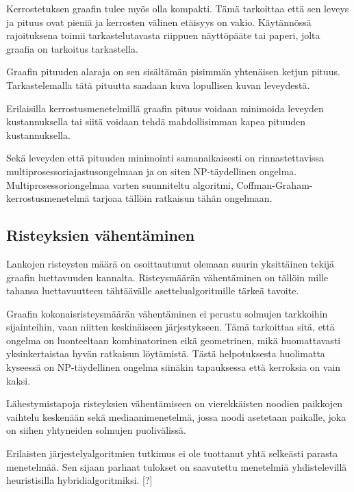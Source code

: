 \documentclass[finnish,12pt]{article}
\begin{document}
Kerrostetuksen graafin tulee myös olla kompakti. Tämä tarkoittaa että sen leveys ja pituus ovat pieniä ja kerrosten välinen etäisyys on vakio. 
Käytännössä rajoituksena toimii tarkastelutavasta riippuen näyttöpääte tai paperi, jolta graafia on tarkoitus tarkastella.

Graafin pituuden alaraja on sen sisältämän pisimmän yhtenäisen ketjun pituus. Tarkastelemalla tätä pituutta saadaan kuva lopullisen kuvan leveydestä.

Erilaisilla kerrostusmenetelmillä graafin pituus voidaan minimoida leveyden kustannuksella tai siitä voidaan tehdä mahdollisimman kapea pituuden kustannuksella.

Sekä leveyden että pituuden minimointi samanaikaisesti on rinnastettavissa multiprosessoriajastusongelmaan ja on siten NP-täydellinen ongelma. \cite{RefWorks:39}
Multiprosessoriongelmaa varten suunniteltu algoritmi, Coffman-Graham-kerrostusmenetelmä tarjoaa tällöin ratkaisun tähän ongelmaan.

		\subsection{Risteyksien vähentäminen}

Lankojen risteysten määrä on osoittautunut olemaan suurin yksittäinen tekijä graafin luettavuuden kannalta. \cite{RefWorks:47}
Risteysmäärän vähentäminen on tällöin mille tahansa luettavuutteen tähtäävälle asettelualgoritmille tärkeä tavoite.

Graafin kokonaisristeysmäärän vähentäminen ei perustu solmujen tarkkoihin sijainteihin, vaan niitten keskinäiseen järjestykseen. Tämä tarkoittaa sitä, että ongelma on luonteeltaan kombinatorinen eikä geometrinen, mikä huomattavasti yksinkertaistaa hyvän ratkaisun löytämistä.
Tästä helpotuksesta huolimatta kyseessä on NP-täydellinen ongelma siinäkin tapauksessa että kerroksia on vain kaksi. \cite{RefWorks:40}

Lähestymistapoja risteyksien vähentämiseen on vierekkäisten noodien paikkojen
vaihtelu keskenään sekä mediaanimenetelmä, jossa noodi asetetaan paikalle, joka
on siihen yhtyneiden solmujen puolivälissä.


Erilaisten järjestelyalgoritmien tutkimus ei ole tuottanut yhtä selkeästi parasta menetelmää.
Sen sijaan parhaat tulokset on saavutettu menetelmiä yhdistelevillä heuristisilla hybridialgoritmiksi. [?]
\end{document}
